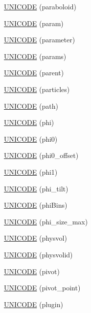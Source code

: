 \begin{DoxyCompactItemize}
\item 
\hyperlink{namespace_d_d4hep_1_1_x_m_l_adb51e1970de68435c3f5fbdeb4fe3085}{UNICODE} (paraboloid)
\item 
\hyperlink{namespace_d_d4hep_1_1_x_m_l_a9187d85c4a29b10e6850e1a5d656b188}{UNICODE} (param)
\item 
\hyperlink{namespace_d_d4hep_1_1_x_m_l_ad4f9a8705d58aa84ec0717cfd7561c5a}{UNICODE} (parameter)
\item 
\hyperlink{namespace_d_d4hep_1_1_x_m_l_a52e98f661a83987e20957764c15ac19b}{UNICODE} (params)
\item 
\hyperlink{namespace_d_d4hep_1_1_x_m_l_afe65bb95b8cfe84f23d42ff297a4d33f}{UNICODE} (parent)
\item 
\hyperlink{namespace_d_d4hep_1_1_x_m_l_a0ec0e2eb98dda2bec1b970f3e51c1bfd}{UNICODE} (particles)
\item 
\hyperlink{namespace_d_d4hep_1_1_x_m_l_a96980e420aa2607ee1714eb0358f0054}{UNICODE} (path)
\item 
\hyperlink{namespace_d_d4hep_1_1_x_m_l_a866db1958e001c63d3211b496605e212}{UNICODE} (phi)
\item 
\hyperlink{namespace_d_d4hep_1_1_x_m_l_a9551f886e9ee6a2333626ada3c047129}{UNICODE} (phi0)
\item 
\hyperlink{namespace_d_d4hep_1_1_x_m_l_a536a0baada377b69d18a17d281d38222}{UNICODE} (phi0\_\-offset)
\item 
\hyperlink{namespace_d_d4hep_1_1_x_m_l_afadb48f0b9a0a1314fd125736d04e77a}{UNICODE} (phi1)
\item 
\hyperlink{namespace_d_d4hep_1_1_x_m_l_ae0ac409da46cdab3d21dbab61c6ab2ba}{UNICODE} (phi\_\-tilt)
\item 
\hyperlink{namespace_d_d4hep_1_1_x_m_l_aeb36f68f2fb69e32f27bb50a76737817}{UNICODE} (phiBins)
\item 
\hyperlink{namespace_d_d4hep_1_1_x_m_l_ac8edac64d777f435f802b6f1382b8113}{UNICODE} (phi\_\-size\_\-max)
\item 
\hyperlink{namespace_d_d4hep_1_1_x_m_l_abe5962ef731f90418ba65dc059a9954a}{UNICODE} (physvol)
\item 
\hyperlink{namespace_d_d4hep_1_1_x_m_l_ae013ea60a3fb4a7149b662fd09775cf8}{UNICODE} (physvolid)
\item 
\hyperlink{namespace_d_d4hep_1_1_x_m_l_af1be45c40a6ef0e5d1369bcd273c6524}{UNICODE} (pivot)
\item 
\hyperlink{namespace_d_d4hep_1_1_x_m_l_afa72edab3eb25484c39069bffd6bc904}{UNICODE} (pivot\_\-point)
\item 
\hyperlink{namespace_d_d4hep_1_1_x_m_l_a96436b2304016932093b8c398f45655b}{UNICODE} (plugin)

\end{DoxyCompactItemize}
